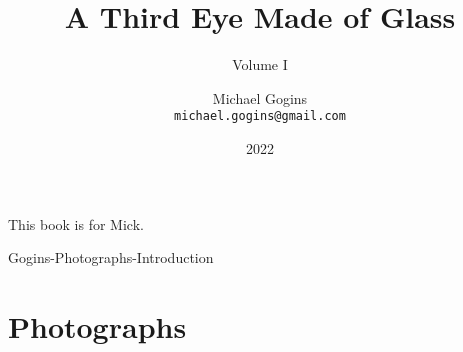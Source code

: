 \documentclass[11pt,letter,DIV=14,paper=landscape]{scrbook}
\begin{document}
\frontmatter

\title{A Third Eye Made of Glass}
\subtitle{Volume I }
\author{Michael Gogins \\ \texttt{michael.gogins@gmail.com}}
\date{2022 }
\publishers{Irreducible Productions}

\maketitle
	


\begin{dedication}
This book is for Mick.
\end{dedication}

\tableofcontents

\mainmatter
{}

\setlength{\columnsep}{3em}
\twocolumn

 {Gogins-Photographs-Introduction}	
	
\onecolumn
\chapter{Photographs}
\clearpage



\end{document}
